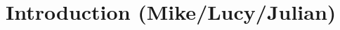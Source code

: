 \documentclass[../main.tex]{subfiles}
\begin{document}
\section{Introduction (Mike/Lucy/Julian)}
\label{sec:intro}









\end{document}
